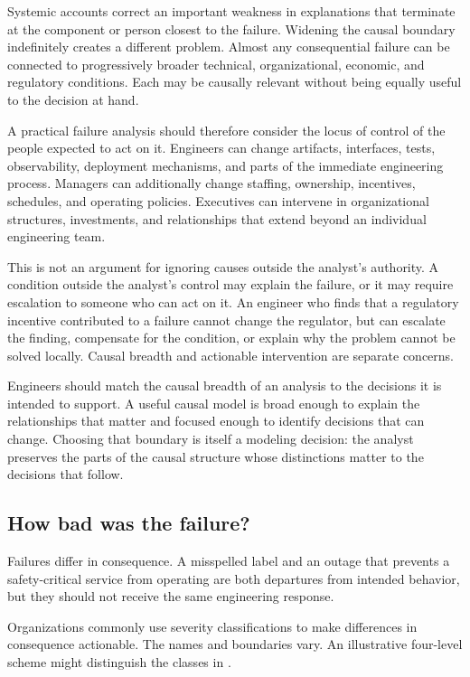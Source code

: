Systemic accounts correct an important weakness in explanations that terminate at the component or
person closest to the failure. Widening the causal boundary indefinitely creates a different
problem. Almost any consequential failure can be connected to progressively broader technical,
organizational, economic, and regulatory conditions. Each may be causally relevant without being
equally useful to the decision at hand.

A practical failure analysis should therefore consider the locus of control of the people expected
to act on it. Engineers can change artifacts, interfaces, tests, observability, deployment
mechanisms, and parts of the immediate engineering process. Managers can additionally change
staffing, ownership, incentives, schedules, and operating policies. Executives can intervene in
organizational structures, investments, and relationships that extend beyond an individual
engineering team.

This is not an argument for ignoring causes outside the analyst's authority. A condition outside
the analyst's control may explain the failure, or it may require escalation to someone who can act
on it. An engineer who finds that a regulatory incentive contributed to a failure cannot change
the regulator, but can escalate the finding, compensate for the condition, or explain why the
problem cannot be solved locally. Causal breadth and actionable intervention are separate
concerns.

Engineers should match the causal breadth of an analysis to the decisions it is intended to
support. A useful causal model is broad enough to explain the relationships that matter and
focused enough to identify decisions that can change. Choosing that boundary is itself a modeling
decision: the analyst preserves the parts of the causal structure whose distinctions matter to the
decisions that follow.

\subsection{How bad was the failure?}\label{sec-severity}

Failures differ in consequence. A misspelled label and an outage that prevents a safety-critical
service from operating are both departures from intended behavior, but they should not receive the
same engineering response.

Organizations commonly use severity classifications to make differences in consequence actionable.
The names and boundaries vary. An illustrative four-level scheme might distinguish the classes in
\citet{tbl-severity-scale}.

